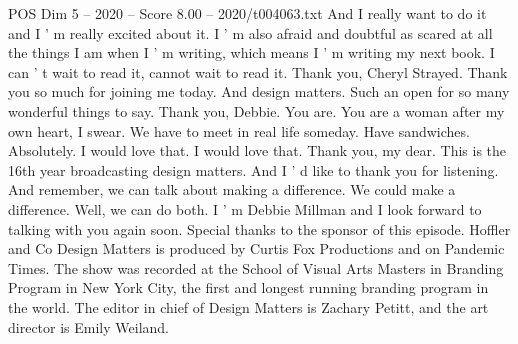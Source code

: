 \begin{textsample}{POS Dim 5 – 2020 – Score 8.00 – 2020/t004063.txt}
And I really want to do it and I ' m really excited about it.
I ' m also afraid and doubtful as scared at all the things I am when I ' m writing, which means I ' m writing my next book.
I can ' t wait to read it, cannot wait to read it.
Thank you, Cheryl Strayed.
Thank you so much for joining me today.
And design matters.
Such an open for so many wonderful things to say.
Thank you, Debbie.
You are.
You are a woman after my own heart, I swear.
We have to meet in real life someday.
Have sandwiches.
Absolutely.
I would love that.
I would love that.
Thank you, my dear.
This is the 16th year broadcasting design matters.
And I ' d like to thank you for listening.
And remember, we can talk about making a difference.
We could make a difference.
Well, we can do both.
I ' m Debbie Millman and I look forward to talking with you again soon.
Special thanks to the sponsor of this episode.
Hoffler and Co Design Matters is produced by Curtis Fox Productions and on Pandemic Times.
The show was recorded at the School of Visual Arts Masters in Branding Program in New York City, the first and longest running branding program in the world.
The editor in chief of Design Matters is Zachary Petitt, and the art director is Emily Weiland.

\end{textsample}
